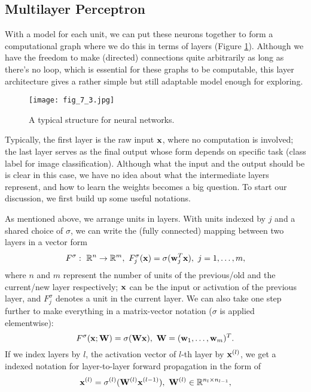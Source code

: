 \documentclass[../main.tex]{subfiles}
\begin{document}
\subsection{Multilayer Perceptron}
With a model for each unit, we can put these neurons together to form a computational graph where we do this in terms of layers (Figure \ref{fig_7_3}). Although we have the freedom to make (directed) connections quite arbitrarily as long as there's no loop, which is essential for these graphs to be computable, this layer architecture gives a rather simple but still adaptable model enough for exploring. 
\begin{figure}[h] 
	\centering 
	\texttt{[image: fig\_7\_3.jpg]} 
	\caption{A typical structure for neural networks.}\label{fig_7_3}
\end{figure}
\par Typically, the first layer is the raw input ${\bf x}$, where no computation is involved; the last layer serves as the final output whose form depends on specific task (class label for image classification). Although what the input and the output should be is clear in this case, we have no idea about what the intermediate layers represent, and how to learn the weights becomes a big question. To start our discussion, we first build up some useful notations.
\par As mentioned above, we arrange units in layers. With units indexed by $j$ and a shared choice of $\sigma$, we can write the (fully connected) mapping between two layers in a vector form
\begin{equation*}
F^{\sigma}:\ \mathbb{R}^n\rightarrow \mathbb{R}^m,\ F^{\sigma}_{j}({\bf x})=\sigma({\bf w}_j^T{\bf x}),\ j=1,\dots,m,
\end{equation*}
where $n$ and $m$ represent the number of units of the previous/old and the current/new layer respectively; ${\bf x}$ can be the input or activation of the previous layer, and $ F^{\sigma}_{j}$ denotes a unit in the current layer. We can also take one step further to make everything in a matrix-vector notation ($\sigma$ is applied elementwise):
\begin{equation*}
F^{\sigma}({\bf x};{\bf W})=\sigma({\bf Wx}),\ {\bf W}=({\bf w}_1,\dots, {\bf w}_m)^T.
\end{equation*}
If we index layers by $l$, the activation vector of $l$-th layer by ${\bf x}^{(l)}$, we get a indexed notation for layer-to-layer forward propagation in the form of
\begin{equation*}
{\bf x}^{(l)}=\sigma^{(l)}({\bf W}^{(l)}{\bf x}^{(l-1)}),\ {\bf W}^{(l)}\in \mathbb{R}^{n_l\times n_{l-1}},
\end{equation*}
\end{document}
